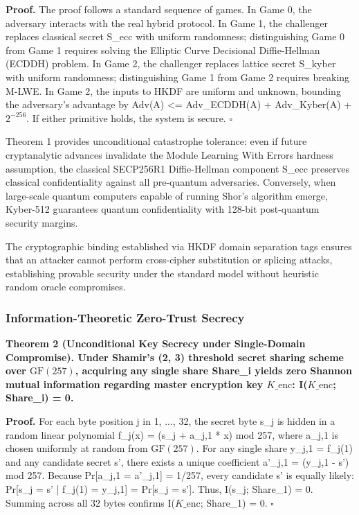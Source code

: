 \documentclass[5p,times]{elsarticle}
\newenvironment{proof}{\noindent\textbf{Proof.}}{\hfill$\square$\par\medskip}
\begin{document}
\begin{proof}
The proof follows a standard sequence of games. In Game 0, the adversary interacts with the real hybrid protocol. In Game 1, the challenger replaces classical secret S\_ecc with uniform randomness; distinguishing Game 0 from Game 1 requires solving the Elliptic Curve Decisional Diffie-Hellman (ECDDH) problem. In Game 2, the challenger replaces lattice secret S\_kyber with uniform randomness; distinguishing Game 1 from Game 2 requires breaking M-LWE. In Game 2, the inputs to HKDF are uniform and unknown, bounding the adversary's advantage by Adv(A) <= Adv\_ECDDH(A) + Adv\_Kyber(A) + $2^{-256}$. If either primitive holds, the system is secure.
\end{proof}

Theorem 1 provides unconditional catastrophe tolerance: even if future cryptanalytic advances invalidate the Module Learning With Errors hardness assumption, the classical SECP256R1 Diffie-Hellman component S\_ecc preserves classical confidentiality against all pre-quantum adversaries. Conversely, when large-scale quantum computers capable of running Shor's algorithm emerge, Kyber-512 guarantees quantum confidentiality with 128-bit post-quantum security margins.

The cryptographic binding established via HKDF domain separation tags ensures that an attacker cannot perform cross-cipher substitution or splicing attacks, establishing provable security under the standard model without heuristic random oracle compromises.


\subsubsection{Information-Theoretic Zero-Trust Secrecy}

\noindent\textbf{\textbf{Theorem 2 (Unconditional Key Secrecy under Single-Domain Compromise).} Under Shamir's (2, 3) threshold secret sharing scheme over $\text{GF}(257)$, acquiring any single share Share\_i yields zero Shannon mutual information regarding master encryption key $K\_{\text{enc}}$: I($K\_{\text{enc}}$; Share\_i) = 0.}

\begin{proof}
For each byte position j in {1, ..., 32}, the secret byte s\_j is hidden in a random linear polynomial f\_j(x) = (s\_j + a\_{j,1} * x) mod 257, where a\_{j,1} is chosen uniformly at random from $\text{GF}(257)$. For any single share y\_{j,1} = f\_j(1) and any candidate secret s', there exists a unique coefficient a'\_{j,1} = (y\_{j,1} - s') mod 257. Because Pr[a\_{j,1} = a'\_{j,1}] = 1/257, every candidate s' is equally likely: Pr[s\_j = s' | f\_j(1) = y\_{j,1}] = Pr[s\_j = s']. Thus, I(s\_j; Share\_1) = 0. Summing across all 32 bytes confirms I($K\_{\text{enc}}$; Share\_1) = 0.
\end{proof}
\end{document}
